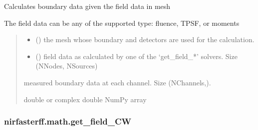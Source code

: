 \documentclass[letterpaper,10pt,english]{sphinxmanual}
\begin{document}
\begin{fulllineitems}
\label{\detokenize{_autosummary/nirfasterff.math.get_boundary_data:nirfasterff.math.get_boundary_data}}
\pysigstartsignatures
{}
\pysigstopsignatures
\sphinxAtStartPar
Calculates boundary data given the field data in mesh

\sphinxAtStartPar
The field data can be any of the supported type: fluence, TPSF, or moments
\begin{quote}\begin{description}
\begin{itemize}
\item {} 
\sphinxAtStartPar
{} () \textendash{} the mesh whose boundary and detectors are used for the calculation.

\item {} 
\sphinxAtStartPar
{} () \textendash{} field data as calculated by one of the ‘get\_field\_*’ solvers. Size (NNodes, NSources)

\end{itemize}

\sphinxAtStartPar
{} \textendash{} measured boundary data at each channel. Size (NChannels,).

\sphinxAtStartPar
double or complex double NumPy array

\end{description}\end{quote}

\end{fulllineitems}


\sphinxstepscope


\subsubsection{nirfasterff.math.get\_field\_CW}
\label{\detokenize{_autosummary/nirfasterff.math.get_field_CW:nirfasterff-math-get-field-cw}}\label{\detokenize{_autosummary/nirfasterff.math.get_field_CW::doc}}
\end{document}
